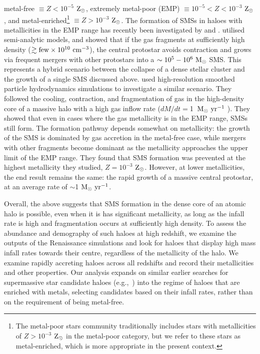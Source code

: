 \documentclass[graphics, twocolumn, usenatbib]{mn2e}
\newcommand{\msolaryr} {$\rm{M_{\odot}~yr^{-1}}~$}
\newcommand{\msolaryrc} {$\rm{M_{\odot}~yr^{-1}}$}
\newcommand{\zsolar} {$\rm{Z_{\odot}}~$}
\newcommand{\zsolarc} {$\rm{Z_{\odot}}$}
\begin{document}
metal-free $\equiv Z < 10^{-5}$ \zsolarc,
extremely metal-poor (EMP) $\equiv 10^{-5} < Z < 10^{-3}$ \zsolarc,
and metal-enriched\footnote{The metal-poor stars community traditionally includes stars with
  metallicities of $Z > 10^{-3}$ \zsolar in the metal-poor category, but we refer to these stars as metal-enriched, which 
  is more appropriate in the present context.} $\equiv Z > 10^{-3}$ \zsolarc. 
  The formation of SMSs in haloes with metallicities in the EMP range
  has recently been investigated by \cite{Tagawa_2020} and \cite{Chon_2020}. \cite{Tagawa_2020}  utilised semi-analytic models, and showed that if the gas fragments at sufficiently high density ($\gtrsim {\rm few}\times 10^{10}~{\rm cm^{-3}}$), the central protostar avoids contraction and  grows via frequent mergers with other protostars into a $\sim 10^5-10^6~{\rm M_\odot}$ SMS. This represents a hybrid scenario between the collapse of a dense stellar cluster and the growth of a single SMS discussed above.
   \cite{Chon_2020} used high-resolution smoothed particle
  hydrodynamics simulations to investigate a similar scenario. They followed the cooling, contraction, and fragmentation of gas in the high-density core of a massive halo with a high gas inflow rate ($dM/dt=$1~\msolaryr).  They showed that even in cases where the gas metallicity is in the EMP range, SMSs still form. The formation pathway depends somewhat on metallicity: the growth of the SMS is dominated by gas accretion in the metal-free case, while mergers with other fragments become dominant as the metallicity approaches the upper limit of the EMP range. They found that SMS formation was prevented at the highest metallicity they studied, $Z=10^{-3}$ \zsolarc. However, at lower metallicities, the end result remains the same: the rapid growth of a massive central protostar, at an average rate of $\sim$1 \msolaryrc.
  
Overall, the above suggests that SMS formation in the dense core of an atomic halo is possible, even when it is has significant metallicity, as long as the infall rate is high and fragmentation occurs at sufficiently high density.  
To assess the abundance and demography of such haloes at high redshift, we examine the outputs of the Renaissance simulations
and look for haloes that display high mass infall rates towards their centre, regardless of the metallicity of the halo.
We examine rapidly accreting haloes across all redshifts and record their metallicities and other properties.
Our analysis expands on similar earlier searches for supermassive star candidate haloes (e.g.,~\citealt{Habouzit_2016,Wise_2019}) into the regime of haloes that are enriched with metals, selecting candidates based on their infall rates, rather than on the requirement of being metal-free.
\end{document}
